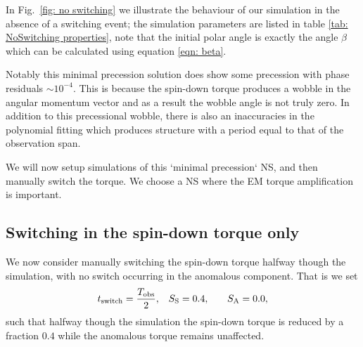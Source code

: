 \documentclass[../full_thesis/full_thesis.tex]{subfiles}
\newcommand{\thisdir}{../inertial_frame}
\begin{document}
In Fig.~\ref{fig: no switching} we illustrate the behaviour of our simulation
in the absence of a switching event; the simulation parameters are listed in
table \ref{tab: NoSwitching properties}, note that the initial polar angle is
exactly the angle $\beta$ which can be calculated using equation \eqref{eqn:
beta}.
\begin{figure}[htb]
\begin{floatrow}
\capbtabbox{%
  
}{%
  \caption{}%
  \label{tab: NoSwitching properties}
}
\end{floatrow}
\end{figure}
Notably this minimal precession solution does show some precession with phase
residuals $\sim 10^{-4}$. This is because the spin-down torque produces a wobble
in the angular momentum vector and as a result the wobble angle is not truly
zero. In addition to this precessional wobble, there is also an inaccuracies
in the polynomial fitting which produces structure with a period equal to that
of the observation span.

We will now setup simulations of this `minimal precession` NS, and then
manually switch the torque. We choose a NS where the EM torque amplification
is important.

\subsection{Switching in the spin-down torque only}
We now consider manually switching the spin-down torque halfway though the
simulation, with no switch occurring in the anomalous component.
That is we set
\begin{align}
    t_{\mathrm{switch}} = \frac{T_{\textrm{obs}}}{2}, &&& S_{\mathrm{S}} = 0.4, &&& S_{\mathrm{A}} = 0.0,
\end{align}
such that halfway though the simulation the spin-down torque is reduced by a
fraction $0.4$ while the anomalous torque remains unaffected.
\end{document}
